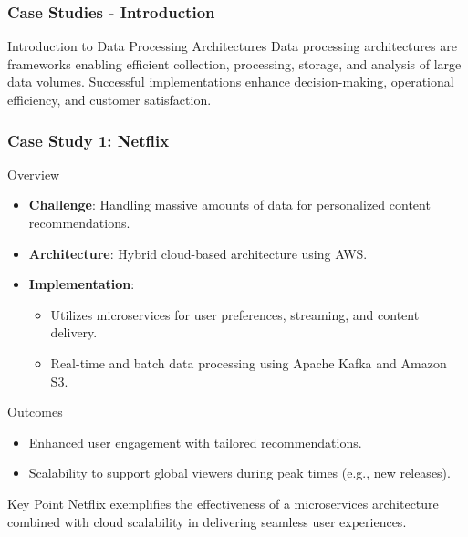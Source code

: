 \documentclass[aspectratio=169]{beamer}
\begin{document}
\begin{frame}[fragile]
    \frametitle{Case Studies - Introduction}
    \begin{block}{Introduction to Data Processing Architectures}
        Data processing architectures are frameworks enabling efficient collection, processing, storage, and analysis of large data volumes. Successful implementations enhance decision-making, operational efficiency, and customer satisfaction.
    \end{block}
\end{frame}

\begin{frame}[fragile]
    \frametitle{Case Study 1: Netflix}
    \begin{block}{Overview}
        \begin{itemize}
            \item \textbf{Challenge}: Handling massive amounts of data for personalized content recommendations.
            \item \textbf{Architecture}: Hybrid cloud-based architecture using AWS.
            \item \textbf{Implementation}:
            \begin{itemize}
                \item Utilizes microservices for user preferences, streaming, and content delivery.
                \item Real-time and batch data processing using Apache Kafka and Amazon S3.
            \end{itemize}
        \end{itemize}
    \end{block}
    \begin{block}{Outcomes}
        \begin{itemize}
            \item Enhanced user engagement with tailored recommendations.
            \item Scalability to support global viewers during peak times (e.g., new releases).
        \end{itemize}
    \end{block}
    \begin{block}{Key Point}
        Netflix exemplifies the effectiveness of a microservices architecture combined with cloud scalability in delivering seamless user experiences.
    \end{block}
\end{frame}
\end{document}
